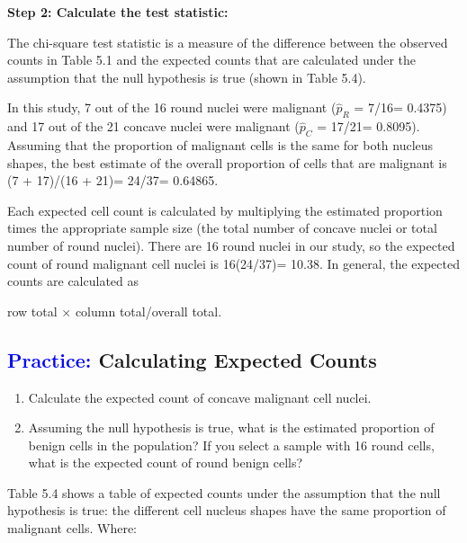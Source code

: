 \documentclass[
]{report}
\begin{document}
\textbf{Step 2: Calculate the test statistic:}

The chi-square test statistic is a measure of the difference between the observed counts in Table 5.1 and the expected counts that are calculated under the assumption that the null hypothesis is true (shown in Table 5.4).

In this study, 7 out of the 16 round nuclei were malignant (\(\scriptstyle \hat p_R\) = 7/16= 0.4375) and 17 out of the 21 concave nuclei were malignant (\(\scriptstyle \hat p_C\) = 17/21= 0.8095). Assuming that the proportion of malignant cells is the same for both nucleus shapes, the best estimate of the overall proportion of cells that are malignant is (7 + 17)/(16 + 21)= 24/37= 0.64865.

Each expected cell count is calculated by multiplying the estimated proportion times the
­appropriate sample size (the total number of concave nuclei or total number of round nuclei). There are 16 round nuclei in our study, so the expected count of round malignant cell nuclei is 16(24/37)= 10.38. In general, the expected counts are calculated as

\begin{center}
row total $\times$ column total/overall total.
\end{center}

\hypertarget{calculating-expected-counts}{%
\subsection*{\texorpdfstring{\textcolor{blue}{Practice:} Calculating Expected Counts}{ Calculating Expected Counts}}\label{calculating-expected-counts}}

\begin{enumerate}
\def\labelenumi{\arabic{enumi}.}
\setcounter{enumi}{16}
\item
  Calculate the expected count of concave malignant cell nuclei.
\item
  Assuming the null hypothesis is true, what is the estimated proportion of benign cells in the population? If you select a sample with 16 round cells, what is the expected count of round benign cells?
\end{enumerate}

Table 5.4 shows a table of expected counts under the assumption that the null hypothesis is true: the different cell nucleus shapes have the same proportion of malignant cells. Where:
\end{document}
